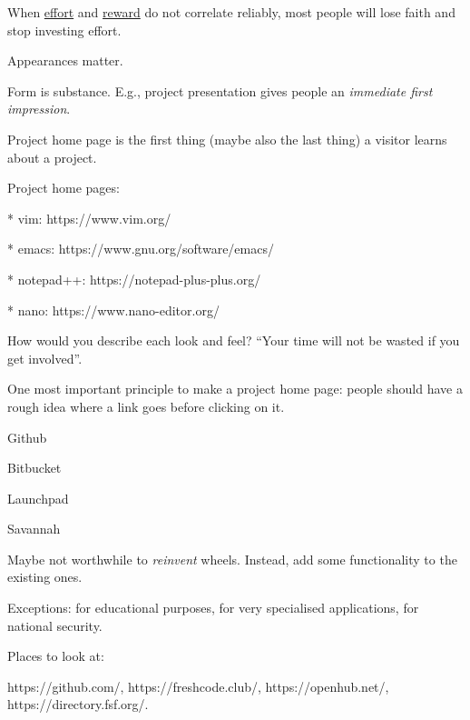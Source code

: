 \documentclass[landscape,30pt]{foils}
\begin{document}

When \underline{effort} and \underline{reward} do not correlate reliably, most people will lose faith and stop investing effort.


Appearances matter.

Form is substance.  E.g., project presentation gives people an {\em immediate first impression}.

Project home page is the first thing (maybe also the last thing) a visitor learns about a project.

Project home pages:

* vim: https://www.vim.org/

* emacs: https://www.gnu.org/software/emacs/

* notepad++: https://notepad-plus-plus.org/

* nano: https://www.nano-editor.org/

How would you describe each look and feel?  ``Your time will not be wasted if you get involved''.

One most important principle to make a project home page: people should have a rough idea where a link goes before clicking on it.


Github

Bitbucket

Launchpad

Savannah



Maybe not worthwhile to {\em reinvent} wheels.  Instead, add some functionality to the existing ones.

Exceptions: for educational purposes, for very specialised applications, for national security.

Places to look at:

https://github.com/, https://freshcode.club/, https://openhub.net/, https://directory.fsf.org/.


\end{document}
